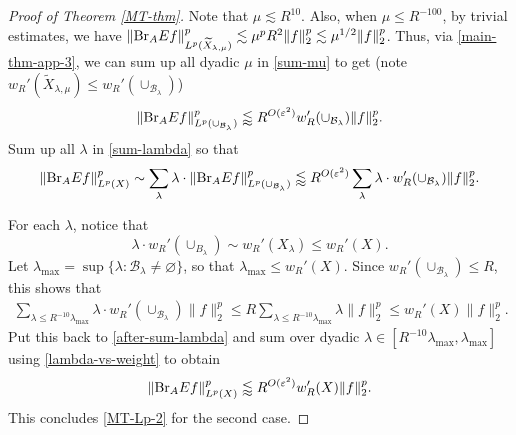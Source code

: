 \documentclass{amsart}
\numberwithin{equation}{section}
\newcommand{\e}{\varepsilon}
\newcommand{\la}{\lambda}
\newcommand{\cb}{\mathcal B}
\newcommand{\wt}{\widetilde}
\newcommand{\BR}{{\rm{Br}}}
\begin{document}
\begin{proof}[Proof of Theorem \ref{MT-thm}]
Note that $\mu\lesssim R^{10}$.
Also, when $\mu\leq R^{-100}$, by trivial estimates, we have $\|\BR_{A}Ef\|_{L^p(\wt X_{\la,\mu})}^p\lesssim \mu^p R^2\|f\|_2^p\lesssim \mu^{1/2}\|f\|_2^p$.
Thus, via \eqref{main-thm-app-3}, we can sum up all dyadic $\mu$ in \eqref{sum-mu} to get (note $w_R'(\wt X_{\la,\mu})\leq w_R'(\cup_{\cb_\la})$) 
\begin{equation}
    \|\BR_{A}Ef\|_{L^p(\cup_{\cb_\la})}^p\lessapprox  R^{O(\e^2)} w_R'(\cup_{\cb_\la})\|f\|_2^p.
\end{equation}
Sum up all $\la$ in \eqref{sum-lambda} so that
\begin{equation}
\label{after-sum-lambda}
    \|\BR_{A}Ef\|_{L^p(X)}^p\sim\sum_{\la}\la\cdot\|\BR_{A}Ef\|_{L^p(\cup_{\cb_\la})}^p\lessapprox R^{O(\e^2)}\sum_\la \la \cdot w_R'(\cup_{\cb_\la})\|f\|_2^p.
\end{equation}

For each $\la$, notice that 
\begin{equation}
\label{lambda-vs-weight}
    \la\cdot w_R'(\cup_{B_\la})\sim w_R'(X_\la)\leq w_R'(X).
\end{equation}
Let $\la_{\max}=\sup\{\la:\cb_\la\not=\varnothing\}$, so that $\la_{\max}\leq w_R'(X)$.
Since $w_R'(\cup_{\cb_\la})\leq R$, this shows that
\begin{align}
    \sum_{\la\leq R^{-10}\la_{\max}} \la \cdot w_R'(\cup_{\cb_\la})\|f\|_2^p\leq R\sum_{\la\leq R^{-10}\la_{\max}} \la \|f\|_2^p\leq w_R'(X)\|f\|_2^p.
\end{align}
Put this back to \eqref{after-sum-lambda} and sum over dyadic $\la\in[R^{-10}\la_{\max}, \la_{\max}]$ using \eqref{lambda-vs-weight} to obtain
\begin{equation}
    \|\BR_{A}Ef\|_{L^p(X)}^p\lessapprox R^{O(\e^2)}w_R'(X)\|f\|_2^p.
\end{equation}
This concludes \eqref{MT-Lp-2} for the second case. 
\qedhere

\end{proof}



\bigskip



\end{document}
